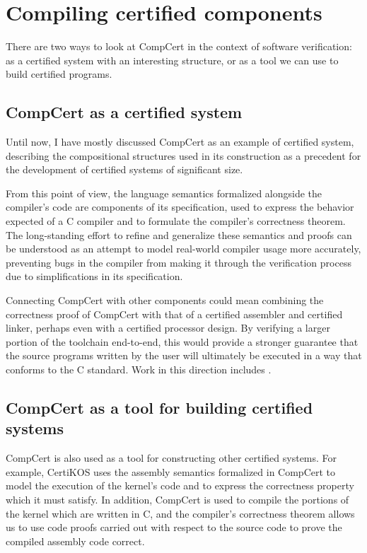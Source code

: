 \documentclass[11pt,oneside]{book}
\theoremstyle{definition}
\begin{document}


\section{Compiling certified components} %

There are two ways to look at CompCert
in the context of software verification:
as a certified system
with an interesting structure,
or as a tool
we can use to build certified programs.

\subsection{CompCert as a certified system}

Until now,
I have mostly discussed
CompCert as an example of certified system,
describing the compositional structures used in
its construction as a precedent for the development of
certified systems of significant size.

From this point of view,
the language semantics
formalized alongside the compiler's code
are components of its specification,
used to express the behavior expected of
a C compiler
and to formulate the compiler's correctness theorem.
The long-standing effort to refine and generalize
these semantics and proofs
can be understood as
an attempt to model real-world compiler usage
more accurately,
preventing bugs in the compiler
from making it through the verification process
due to simplifications in its specification.

Connecting CompCert with other components
could mean combining the correctness proof of CompCert
with that of a certified assembler
and certified linker,
perhaps even with a certified processor design.
By verifying a larger portion of the toolchain end-to-end,
this would provide a stronger guarantee
that the source programs written by the user
will ultimately be executed in a way that conforms to
the C standard.
Work in this direction includes \cite{stackaware}.

\subsection{CompCert as a tool for building certified systems}

CompCert is also used as a tool
for constructing other certified systems.
For example,
CertiKOS uses the assembly semantics formalized in CompCert
to model the execution of the kernel's code
and to express the correctness property
which it must satisfy.
In addition,
CompCert is used to compile the portions of the kernel
which are written in C,
and the compiler's correctness theorem
allows us to use code proofs carried out
with respect to the source code
to prove the compiled assembly code correct.
\end{document}
